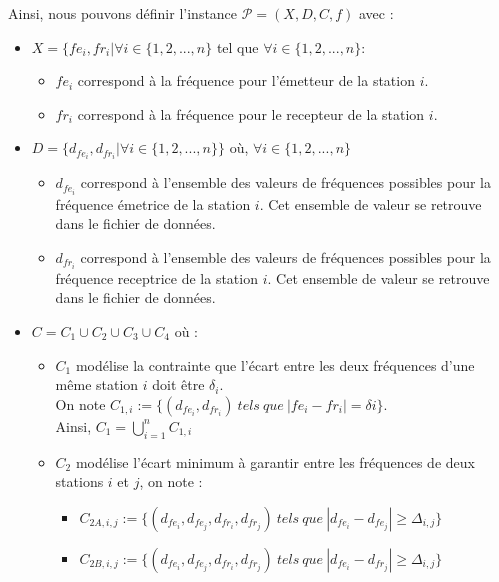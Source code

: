 \documentclass[a4paper, 10pt]{article}
\begin{document}
      Ainsi, nous pouvons définir l'instance $\mathcal{P} = (X, D, C, f)$ avec :
      \begin{itemize}
        \item $X = \{ fe_i, fr_i | \forall i \in \{1,2,...,n\}$ tel que $\forall i \in \{1,2,...,n\}$:
              \begin{itemize}
                \item $fe_{i}$ correspond à la fréquence pour l'émetteur de la station $i$.
                \item $fr_{i}$ correspond à la fréquence pour le recepteur de la station $i$.
              \end{itemize}
        \item $D = \{d_{fe_i}, d_{fr_i} | \forall i \in \{1,2,...,n\} \}$ où, $\forall i \in \{1,2,...,n\}$
              \begin{itemize}
                \item $d_{fe_i}$ correspond à l'ensemble des valeurs de fréquences possibles pour la fréquence émetrice de la station $i$. Cet ensemble de valeur se retrouve dans le fichier de données.
                \item $d_{fr_i}$ correspond à l'ensemble des valeurs de fréquences possibles pour la fréquence receptrice de la station $i$. Cet ensemble de valeur se retrouve dans le fichier de données.
              \end{itemize}
        \item $C = C_1 \cup C_2 \cup C_3 \cup C_4 $ où :
              \begin{itemize}
                \item $C_1$ modélise la contrainte que l'écart entre les deux fréquences d'une même station $i$ doit être $\delta_{i}$.\\
                 On note $C_{1,i} := \{ (d_{fe_i},d_{fr_i})~ tels~que~ | fe_{i} - fr_{i} | = \delta{i} \}$. \\
                 Ainsi, $\displaystyle{C_1 = \bigcup_{i=1}^{n} C_{1,i}}$
                \item $C_2$ modélise l'écart minimum à garantir entre les fréquences de deux stations $i$ et $j$, on note :
                      \begin{itemize}
                        \item $C_{2A,i,j} := \{(d_{fe_i},d_{fe_j},d_{fr_i},d_{fr_j}) ~tels~que~ | d_{fe_i} - d_{fe_j} | \geq \Delta_{i,j} \}$
                        \item $C_{2B,i,j} := \{(d_{fe_i},d_{fe_j},d_{fr_i},d_{fr_j}) ~tels~que~ | d_{fe_i} - d_{fr_j} | \geq \Delta_{i,j} \}$

\end{itemize}
\end{itemize}
\end{itemize}
\end{document}
